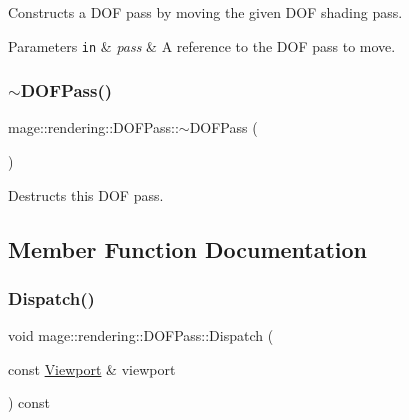 Constructs a D\+OF pass by moving the given D\+OF shading pass.


\begin{DoxyParams}[1]{Parameters}
\mbox{\tt in}  & {\em pass} & A reference to the D\+OF pass to move. \\
\hline
\end{DoxyParams}
\hypertarget{classmage_1_1rendering_1_1_d_o_f_pass_a3009125880a1546657d2f57179299e3b}{}\label{classmage_1_1rendering_1_1_d_o_f_pass_a3009125880a1546657d2f57179299e3b} 
\subsubsection{\texorpdfstring{$\sim$\+D\+O\+F\+Pass()}{~DOFPass()}}
{\footnotesize\ttfamily mage\+::rendering\+::\+D\+O\+F\+Pass\+::$\sim$\+D\+O\+F\+Pass (\begin{DoxyParamCaption}{ }\end{DoxyParamCaption})\hspace{0.3cm}{\ttfamily [default]}}

Destructs this D\+OF pass. 

\subsection{Member Function Documentation}
\hypertarget{classmage_1_1rendering_1_1_d_o_f_pass_aa4ee470748a5a37b62d154beec97c4f7}{}\label{classmage_1_1rendering_1_1_d_o_f_pass_aa4ee470748a5a37b62d154beec97c4f7} 
\subsubsection{\texorpdfstring{Dispatch()}{Dispatch()}}
{\footnotesize\ttfamily void mage\+::rendering\+::\+D\+O\+F\+Pass\+::\+Dispatch (\begin{DoxyParamCaption}\item[{const \hyperlink{classmage_1_1rendering_1_1_viewport}{Viewport} \&}]{viewport }\end{DoxyParamCaption}) const\hspace{0.3cm}{\ttfamily [noexcept]}}

